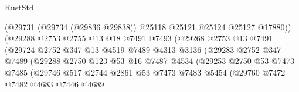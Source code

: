 \begin{lexlean}{RustStd}
\begin{coremodule}
                                  (@29731
                                    (@29734 (@29836 @29838))
                                    @25118
                                    @25121
                                    @25124
                                    @25127
                                    @17880))
                                (@29288
                                  @2753
                                  @2755
                                  @13
                                  @18
                                  @7491
                                  @7493
                                  (@29268
                                    @2753
                                    @13
                                    @7491
                                    (@29724
                                      @2752
                                      @347
                                      @13
                                      @4519
                                      @7489
                                      @4313
                                      @3136
                                      (@29283
                                        @2752
                                        @347
                                        @7489
                                        (@29288
                                          @2750
                                          @123
                                          @53
                                          @16
                                          @7487
                                          @4534
                                          (@29253
                                            @2750
                                            @53
                                            @7473
                                            @7485
                                            (@29746
                                              @517
                                              @2744
                                              @2861
                                              @53
                                              @7473
                                              @7483
                                              @5454
                                              (@29760
                                                @7472
                                                @7482
                                                @4683
                                                @7446
                                                @4689

\end{coremodule}
\end{lexlean}
